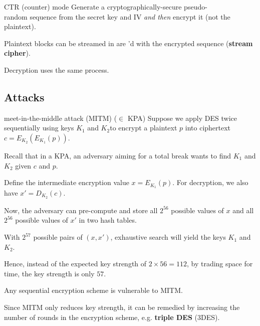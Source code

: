 \begin{defn}{CTR (counter) mode}
    Generate a cryptographically-secure pseudo-\\random sequence from the secret key and IV \textit{and then} encrypt it (not the plaintext).

    Plaintext blocks can be streamed in are 'd with the encrypted sequence (\textbf{stream cipher}).

    Decryption uses the same process.
\end{defn}

\subsection{Attacks}

\begin{defn}{meet-in-the-middle attack (MITM) ($\in$ KPA)}
    Suppose we apply DES twice sequentially using keys $K_1$ and $K_2$to encrypt a plaintext $p$ into ciphertext $c = E_{K_2}(E_{K_1}(p))$.

    Recall that in a KPA, an adversary aiming for a total break wants to find $K_1$ and $K_2$ given $c$ and $p$.

    Define the intermediate encryption value $x = E_{K_1}(p)$.
    For decryption, we also have $x' = D_{K_2}(c)$.

    Now, the adversary can pre-compute and store all $2^{56}$ possible values of $x$ and all $2^{56}$ possible values of $x'$ in two hash tables.

    With $2^{57}$ possible pairs of $(x, x')$, exhaustive search will yield the keys $K_1$ and $K_2$.

    Hence, instead of the expected key strength of $2 \times 56 = 112$, by trading space for time, the key strength is only $57$.
\end{defn}

Any sequential encryption scheme is vulnerable to MITM.

Since MITM only reduces key strength, it can be remedied by increasing the number of rounds in the encryption scheme, e.g. \textbf{triple DES} (3DES).

